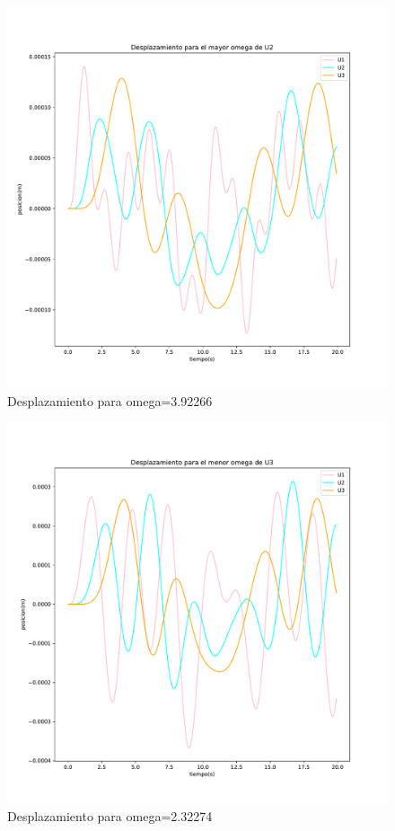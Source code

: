 \documentclass[11pt,letterpaper]{exam}
\begin{document}
\begin{figure}[H]
    \centering
    \includegraphics[width=1\textwidth]{plot_omega3.pdf}
    \caption{Desplazamiento para omega=3.92266}
    \label{fig:my_label}
\end{figure}

\begin{figure}[H]
    \centering
    \includegraphics[width=1\textwidth]{plot_omega4.pdf}
    \caption{Desplazamiento para omega=2.32274}
    \label{fig:my_label}
\end{figure}
\end{document}
